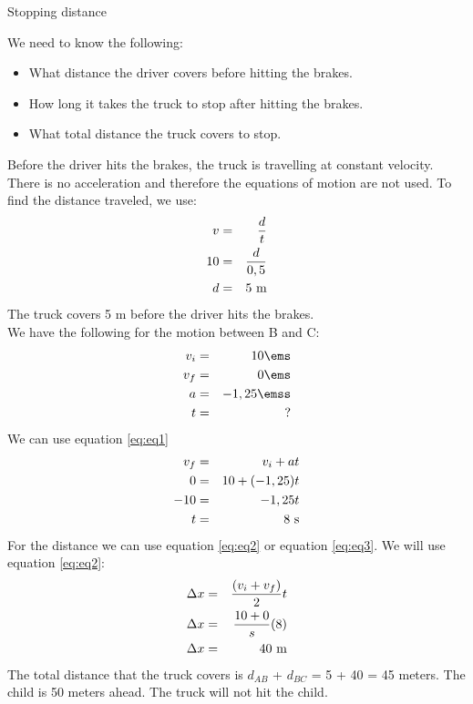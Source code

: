 \begin{wex}{Stopping distance}
{We need to know the following:
\begin{itemize}
\item What distance the driver covers before hitting the brakes.
\item How long it takes the truck to stop after hitting the brakes.
\item What total distance the truck covers to stop.
\end{itemize}
Before the driver hits the brakes, the truck is travelling at constant velocity. There is no acceleration and therefore the equations of motion are not used. To find the distance traveled, we use:
\begin{eqnarray*}
v &=& \frac{d}{t}\\
10 &=& \frac{d}{0,5}\\
d &=& 5~\rm{m}
\end{eqnarray*}
The truck covers 5 m before the driver hits the brakes.\\
We have the following for the motion between B and C:
\begin{eqnarray*}
v_i &=& 10 \ems\\
v_f &=& 0 \ems\\
a &=& -1,25 \emss\\
t &=& ?
\end{eqnarray*}
We can use equation \ref{eq:eq1}
\begin{eqnarray*}
v_f &=& v_i + at\\
0 &=& 10 + (-1,25)t\\
-10 &=& -1,25t\\
t &=& 8~\rm{s}
\end{eqnarray*}
For the distance we can use equation \ref{eq:eq2} or equation \ref{eq:eq3}. We will use equation \ref{eq:eq2}:
\begin{eqnarray*}
\Delta x &=& \frac{(v_i + v_f)}{2}t\\
\Delta x &=& \frac{10 + 0}{s}(8)\\
\Delta x &=& 40~\rm{m}
\end{eqnarray*}
The total distance that the truck covers is $d_{AB}$ + $d_{BC}$ = 5 + 40 = 45 meters.
The child is 50 meters ahead. The truck will not hit the child.
}
\end{wex}

